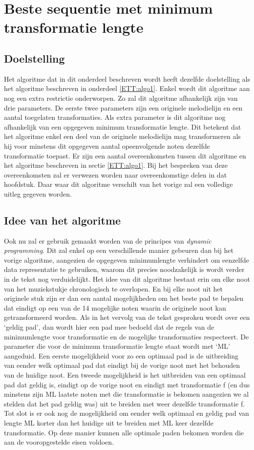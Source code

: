 \section{Beste sequentie met minimum transformatie lengte}
\label{ETT:algo2}

\subsection{Doelstelling}
Het algoritme dat in dit onderdeel beschreven wordt heeft dezelfde doelstelling als het algoritme beschreven in onderdeel \ref{ETT:algo1}. Enkel wordt dit algoritme aan nog een extra restrictie onderworpen. Zo zal dit algoritme afhankelijk zijn van drie parameters. De eerste twee parameters zijn een originele melodielijn en een aantal toegelaten transformaties. Als extra parameter is dit algoritme nog afhankelijk van een opgegeven minimum transformatie lengte. Dit betekent dat het algoritme enkel een deel van de originele melodielijn mag transformeren als hij voor minstens dit opgegeven aantal opeenvolgende noten dezelfde transformatie toepast. Er zijn een aantal overeenkomsten tussen dit algoritme en het algoritme beschreven in sectie \ref{ETT:algo1}. Bij het bespreken van deze overeenkomsten zal er verwezen worden naar overeenkomstige delen in dat hoofdstuk. Daar waar dit algoritme verschilt van het vorige zal een volledige uitleg gegeven worden.

\subsection{Idee van het algoritme}
Ook nu zal er gebruik gemaakt worden van de principes van \textit{dynamic programming}. Dit zal enkel op een verschillende manier gebeuren dan bij het vorige algoritme, aangezien de opgegeven minimumlengte verhindert om eenzelfde data representatie te gebruiken, waarom dit precies noodzakelijk is wordt verder in de tekst nog verduidelijkt. Het idee van dit algoritme bestaat erin om elke noot van het muziekstukje chronologisch te overlopen. En bij elke noot uit het originele stuk zijn er dan een aantal mogelijkheden om het beste pad te bepalen dat eindigt op een van de 14 mogelijke noten waarin de originele noot kan getransformeerd worden. Als in het vervolg van de tekst gesproken wordt over een `geldig pad', dan wordt hier een pad mee bedoeld dat de regels van de minimumlengte voor transformatie en de mogelijke transformaties respecteert. De parameter die voor de minimum transformatie lengte staat wordt met `ML' aangeduid. Een eerste mogelijkheid voor zo een optimaal pad is de uitbreiding van eender welk optimaal pad dat eindigt bij de vorige noot met het behouden van de huidige noot. Een tweede mogelijkheid is het uitbreiden van een optimaal pad dat geldig is, eindigt op de vorige noot en eindigt met transformatie f (en dus minstens zijn ML laatste noten met die transformatie is bekomen aangezien we al stelden dat het pad geldig was) uit te breiden met weer dezelfde transformatie f. Tot slot is er ook nog de mogelijkheid om eender welk optimaal en geldig pad van lengte ML korter dan het huidige uit te breiden met ML keer dezelfde transformatie. Op deze manier kunnen alle optimale paden bekomen worden die aan de vooropgestelde eisen voldoen.

